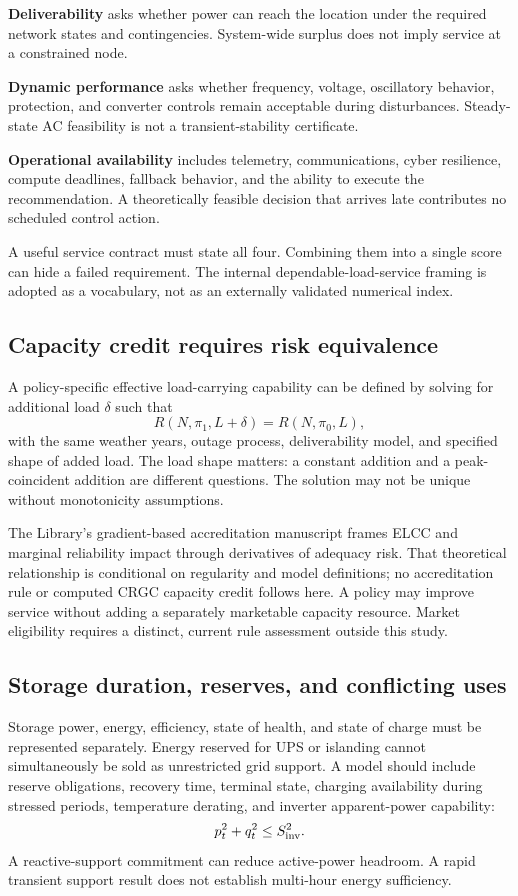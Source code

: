 \documentclass[11pt,letterpaper]{article}
\begin{document}
\textbf{Deliverability} asks whether power can reach the location under the required network states and contingencies. System-wide surplus does not imply service at a constrained node.

\textbf{Dynamic performance} asks whether frequency, voltage, oscillatory behavior, protection, and converter controls remain acceptable during disturbances. Steady-state AC feasibility is not a transient-stability certificate.

\textbf{Operational availability} includes telemetry, communications, cyber resilience, compute deadlines, fallback behavior, and the ability to execute the recommendation. A theoretically feasible decision that arrives late contributes no scheduled control action.

A useful service contract must state all four. Combining them into a single score can hide a failed requirement. The internal dependable-load-service framing is adopted as a vocabulary, not as an externally validated numerical index.

\subsection{Capacity credit requires risk equivalence}
A policy-specific effective load-carrying capability can be defined by solving for additional load $\delta$ such that
\begin{equation}
 R(N,\pi_1,L+\delta)=R(N,\pi_0,L),
 \label{eq:elcc}
\end{equation}
with the same weather years, outage process, deliverability model, and specified shape of added load. The load shape matters: a constant addition and a peak-coincident addition are different questions. The solution may not be unique without monotonicity assumptions.

The Library's gradient-based accreditation manuscript frames ELCC and marginal reliability impact through derivatives of adequacy risk.\cite{elcc} That theoretical relationship is conditional on regularity and model definitions; no accreditation rule or computed CRGC capacity credit follows here. A policy may improve service without adding a separately marketable capacity resource. Market eligibility requires a distinct, current rule assessment outside this study.

\subsection{Storage duration, reserves, and conflicting uses}
Storage power, energy, efficiency, state of health, and state of charge must be represented separately. Energy reserved for UPS or islanding cannot simultaneously be sold as unrestricted grid support. A model should include reserve obligations, recovery time, terminal state, charging availability during stressed periods, temperature derating, and inverter apparent-power capability:
\[
 p_t^2+q_t^2\le S_{\rm inv}^2.
\]
A reactive-support commitment can reduce active-power headroom. A rapid transient support result does not establish multi-hour energy sufficiency.
\end{document}
